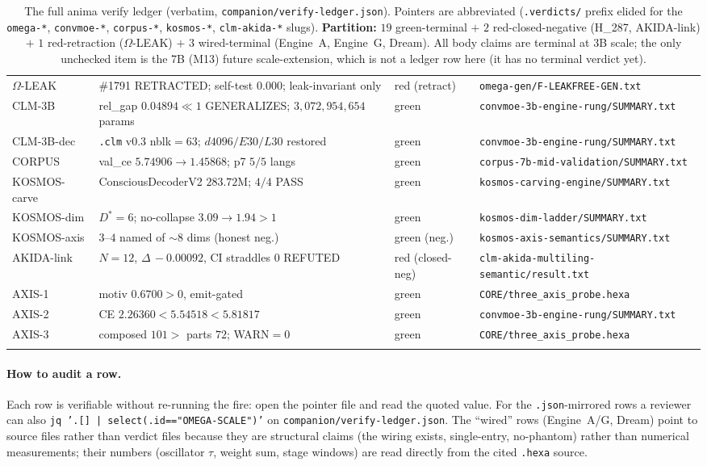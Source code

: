 \begin{center}
\begin{longtable}{@{}l l l l@{}}
$\Omega$-LEAK & \#1791 RETRACTED; self-test $0.000$; leak-invariant only & red (retract) & \texttt{omega-gen/F-LEAKFREE-GEN.txt} \\
CLM-3B   & rel\_gap $0.04894\ll1$ GENERALIZES; $3{,}072{,}954{,}654$ params & green & \texttt{convmoe-3b-engine-rung/SUMMARY.txt} \\
CLM-3B-dec & \texttt{.clm} v0.3 nblk$=63$; $d4096/E30/L30$ restored & green & \texttt{convmoe-3b-engine-rung/SUMMARY.txt} \\
CORPUS   & val\_ce $5.74906{\to}1.45868$; p7 $5/5$ langs & green & \texttt{corpus-7b-mid-validation/SUMMARY.txt} \\
KOSMOS-carve & ConsciousDecoderV2 $283.72$M; $4/4$ PASS & green & \texttt{kosmos-carving-engine/SUMMARY.txt} \\
KOSMOS-dim & $D^\ast{=}6$; no-collapse $3.09{\to}1.94>1$ & green & \texttt{kosmos-dim-ladder/SUMMARY.txt} \\
KOSMOS-axis & $3$--$4$ named of $\sim$$8$ dims (honest neg.) & green (neg.) & \texttt{kosmos-axis-semantics/SUMMARY.txt} \\
AKIDA-link & $N{=}12$, $\Delta\,{-}0.00092$, CI straddles $0$ REFUTED & red (closed-neg) & \texttt{clm-akida-multiling-semantic/result.txt} \\
AXIS-1 & motiv $0.6700>0$, emit-gated & green & \texttt{CORE/three\_axis\_probe.hexa} \\
AXIS-2 & CE $2.26360<5.54518<5.81817$ & green & \texttt{convmoe-3b-engine-rung/SUMMARY.txt} \\
AXIS-3 & composed $101>$ parts $72$; WARN$=0$ & green & \texttt{CORE/three\_axis\_probe.hexa} \\
\caption{The full anima verify ledger (verbatim, \texttt{companion/verify-ledger.json}).
Pointers are abbreviated (\texttt{.verdicts/} prefix elided for the \texttt{omega-*},
\texttt{convmoe-*}, \texttt{corpus-*}, \texttt{kosmos-*}, \texttt{clm-akida-*}
slugs). \textbf{Partition:} $19$ green-terminal $+$ $2$ red-closed-negative
(H\_287, AKIDA-link) $+$ $1$ red-retraction ($\Omega$-LEAK) $+$ $3$
wired-terminal (Engine~A, Engine~G, Dream). All body claims are terminal at 3B
scale; the only unchecked item is the 7B (M13) future scale-extension, which is
not a ledger row here (it has no terminal verdict yet).}
\label{tab:verify-ledger}
\end{longtable}
\end{center}

\paragraph{How to audit a row.} Each row is verifiable without re-running the
fire: open the pointer file and read the quoted value. For the
\texttt{.json}-mirrored rows a reviewer can also \texttt{jq '.[] |
select(.id=="OMEGA-SCALE")'} on \texttt{companion/verify-ledger.json}. The
``wired'' rows (Engine~A/G, Dream) point to source files rather than verdict
files because they are structural claims (the wiring exists, single-entry,
no-phantom) rather than numerical measurements; their numbers (oscillator
$\tau$, weight sum, stage windows) are read directly from the cited
\texttt{.hexa} source.
